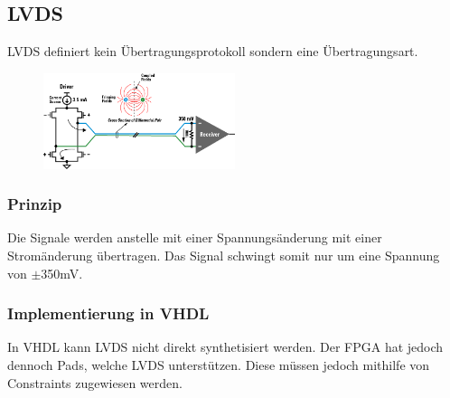 \subsection{LVDS}
LVDS definiert kein Übertragungsprotokoll sondern eine Übertragungsart.
\begin{multicols}{2}
     \begin{figure}[H]
        \includegraphics[width=0.5\textwidth]{images/lvds.png}
    \end{figure}
    
    \subsubsection{Prinzip}
    Die Signale werden anstelle mit einer Spannungsänderung mit einer Stromänderung übertragen. Das Signal schwingt somit nur um eine Spannung von $\pm$350mV.   
    
    \subsubsection{Implementierung in VHDL}
    In VHDL kann LVDS nicht direkt synthetisiert werden. Der FPGA hat jedoch dennoch Pads, welche LVDS unterstützen. Diese müssen jedoch mithilfe von Constraints zugewiesen werden.
    
\end{multicols}